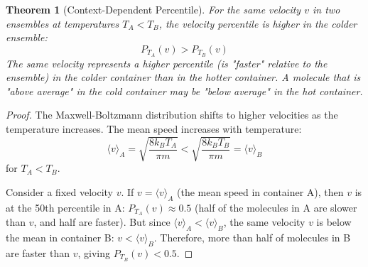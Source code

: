 \documentclass[12pt,a4paper]{article}
\newtheorem{theorem}{Theorem}[section]
\theoremstyle{definition}
\theoremstyle{remark}
\begin{document}
\begin{theorem}[Context-Dependent Percentile]
\label{thm:context_dependent}
For the same velocity $v$ in two ensembles at temperatures $T_A < T_B$, the velocity percentile is higher in the colder ensemble:
\begin{equation}
P_{T_A}(v) > P_{T_B}(v)
\label{eq:percentile_ordering}
\end{equation}
The same velocity represents a higher percentile (is "faster" relative to the ensemble) in the colder container than in the hotter container. A molecule that is "above average" in the cold container may be "below average" in the hot container.
\end{theorem}

\begin{proof}
The Maxwell-Boltzmann distribution shifts to higher velocities as the temperature increases. The mean speed increases with temperature:
\begin{equation}
\langle v \rangle_A = \sqrt{\frac{8k_B T_A}{\pi m}} < \sqrt{\frac{8k_B T_B}{\pi m}} = \langle v \rangle_B
\end{equation}
for $T_A < T_B$.

Consider a fixed velocity $v$. If $v = \langle v \rangle_A$ (the mean speed in container A), then $v$ is at the 50th percentile in A: $P_{T_A}(v) \approx 0.5$ (half of the molecules in A are slower than $v$, and half are faster). But since $\langle v \rangle_A < \langle v \rangle_B$, the same velocity $v$ is below the mean in container B: $v < \langle v \rangle_B$. Therefore, more than half of molecules in B are faster than $v$, giving $P_{T_B}(v) < 0.5$.


\end{proof}
\end{document}
